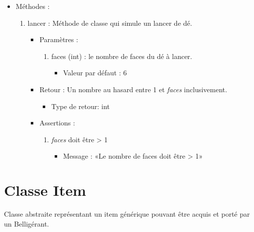 \documentclass[12pt,pdftex,oneside]{article}
\begin{document}
  \begin{itemize}

  \item Méthodes : 

    \begin{enumerate}
    \item lancer : Méthode de classe qui simule un lancer de dé.
      \begin{itemize}
      \item Paramètres : 
        \begin{enumerate}
        \item faces (int) : le nombre de faces du dé à lancer.
          \begin{itemize}
          \item Valeur par défaut : 6
          \end{itemize}
      \end{enumerate}
      \item Retour : Un nombre au hasard entre 1 et \emph{faces} inclusivement.
          \begin{itemize}
          \item Type de retour: int
          \end{itemize}
      \item Assertions : 
        \begin{enumerate}
        \item \emph{faces} doit être > 1
          \begin{itemize}
          \item Message : «Le nombre de faces doit être > 1»
          \end{itemize}
        \end{enumerate}
      \end{itemize}

    \end{enumerate}
  \end{itemize}


  \section {Classe Item}

  Classe abstraite représentant un item générique pouvant être acquis et porté
  par un Belligérant.
\end{document}
